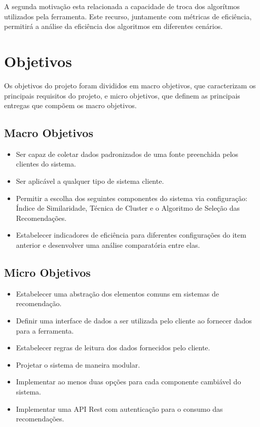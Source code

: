\documentclass[
	12pt,				%
    oneside,			%
	a4paper,			%
	english,			%
	french,				%
	spanish,			%
	brazil,				%
	]{abntex2}
\begin{document}
A segunda motivação esta relacionada a capacidade de troca dos algorítmos utilizados pela ferramenta. Este recurso, juntamente com métricas de eficiência,
permitirá a análise da eficiência dos algoritmos em diferentes cenários.

\section{Objetivos}
Os objetivos do projeto foram divididos em macro objetivos, que caracterizam os principais requisitos do projeto, e micro objetivos, que definem as principais
entregas que compõem os macro objetivos.

\subsection{Macro Objetivos}
\begin{itemize}
	\item Ser capaz de coletar dados padronizados de uma fonte preenchida pelos clientes do sistema.
	\item Ser aplicável a qualquer tipo de sistema cliente.
	\item Permitir a escolha dos seguintes componentes do sistema via configuração: Índice de Similaridade, Técnica de Cluster e o Algoritmo de Seleção das Recomendações. 
	\item Estabelecer indicadores de eficiência para diferentes configurações do item anterior e desenvolver uma análise comparatória entre elas.
\end{itemize}

\subsection{Micro Objetivos}
\begin{itemize}
	\item Estabelecer uma abstração dos elementos comuns em sistemas de recomendação.
	\item Definir uma interface de dados a ser utilizada pelo cliente ao fornecer dados para a ferramenta.
	\item Estabelecer regras de leitura dos dados fornecidos pelo cliente.
	\item Projetar o sistema de maneira modular.
	\item Implementar ao menos duas opções para cada componente cambiável do sistema.
	\item Implementar uma API Rest com autenticação para o consumo das recomendações.
\end{itemize}
\end{document}
